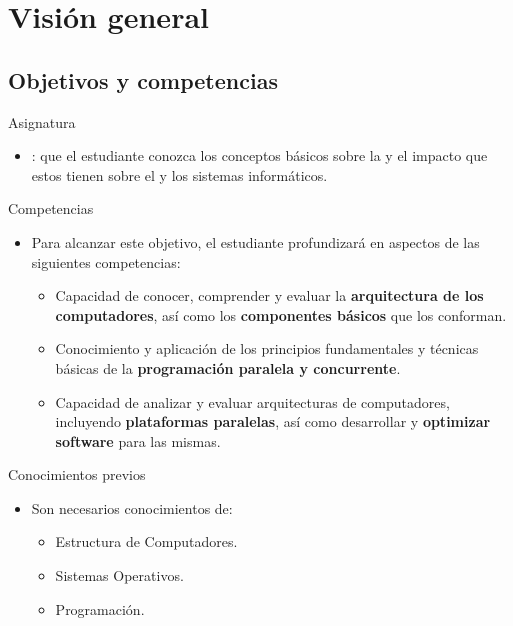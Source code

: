 \section{Visión general}

\subsection{Objetivos y competencias}

\begin{frame}[t]{Asignatura}
\begin{itemize}
  \item {}: que el estudiante conozca los conceptos básicos 
sobre la  y el impacto que estos tienen sobre 
el  y los sistemas informáticos.

\end{itemize}
\end{frame}

\begin{frame}[t]{Competencias}
\begin{itemize}
  \item Para alcanzar este objetivo, el estudiante profundizará en aspectos de las siguientes competencias:
    \begin{itemize}
      \vspace{1.5em}
      \pause
      \item Capacidad de conocer, comprender y evaluar la \textbf{arquitectura de los computadores}, 
            así como los \textbf{componentes básicos} que los conforman.
      \vspace{1.5em}
      \pause
      \item Conocimiento y aplicación de los principios fundamentales y técnicas básicas de la \textbf{programación paralela y concurrente}.
      \vspace{1.5em}
      \pause
      \item Capacidad de analizar y evaluar arquitecturas de computadores, 
            incluyendo \textbf{plataformas paralelas}, así como desarrollar 
            y \textbf{optimizar software} para las mismas.
    \end{itemize}
\end{itemize}
\end{frame}

\begin{frame}[t]{Conocimientos previos}
\begin{itemize}
  \item Son necesarios conocimientos de:
    \begin{itemize}
      \item Estructura de Computadores.
      \item Sistemas Operativos.
      \item Programación.
    \end{itemize}
\end{itemize}
\end{frame}


